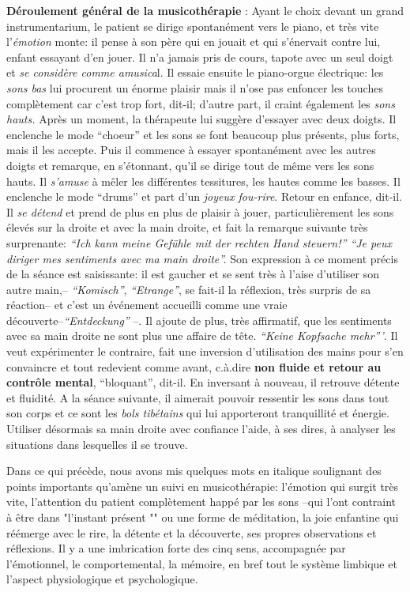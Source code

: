 \textbf{Déroulement général de la musicothérapie} :
Ayant le choix devant un grand instrumentarium,
le patient se dirige spontanément vers le piano, et très vite
l'\textit{émotion} monte: il pense à son père qui en jouait et qui
s'énervait contre lui, enfant essayant d'en
jouer. Il n'a jamais pris de cours, tapote avec un seul doigt et \textit{se considère comme
	amusica}l. Il essaie ensuite le piano-orgue  électrique: les \textit{sons bas}
lui procurent un énorme plaisir mais il n'ose pas enfoncer les touches
complètement car c'est trop fort, dit-il; d'autre part, il
craint également les
\textit{sons hauts.}
Après un moment, la thérapeute lui suggère d'essayer avec deux doigts.
Il enclenche le mode ``choeur'' et les sons se font beaucoup
plus présents, plus forts, mais il les accepte. Puis il commence à essayer spontanément
avec les autres doigts et remarque,  en s'étonnant, qu'il se
dirige tout de même vers les sons
hauts. Il \textit{s'amuse} à mêler les différentes tessitures,
les hautes comme les basses.
Il enclenche le mode ``drums'' et part d'un\textit{ joyeux
	fou-rire}. Retour en enfance, dit-il.
Il \textit{se détend} et prend de plus en plus de plaisir à jouer, particulièrement  les sons élevés
sur la droite et avec la main droite, et fait
la remarque suivante très surprenante:
\textit{``Ich kann meine Gefühle mit der rechten Hand steuern!''
	``Je peux diriger mes sentiments avec ma main droite''.}
Son expression à ce moment précis de la séance est saisissante: il
est gaucher et se sent très à l'aise d'utiliser son autre
main,-- \textit{``Komisch''},  \textit{``Etrange''}, se fait-il
la réflexion, très surpris de sa réaction-- et c'est un événement
accueilli comme une vraie
découverte--\textit{``Entdeckung''} --.
Il ajoute de plus, très affirmatif, que les sentiments avec sa main
droite ne sont plus une affaire de tête. \textit{``Keine
	Kopfsache mehr'''}. Il veut expérimenter le contraire, fait
une inversion d'utilisation des mains pour s'en convaincre et tout redevient comme
avant, c.à.dire \textbf{non fluide et retour au contrôle
	mental},
``bloquant'', dit-il. En inversant à nouveau, il retrouve
détente et fluidité.
A la séance suivante, il aimerait pouvoir ressentir
les sons dans tout son corps et ce sont les\textit{ bols
	tibétains } qui lui
apporteront tranquillité et
énergie. Utiliser désormais sa main
droite avec confiance l'aide, à ses dires, à analyser les
situations dans lesquelles il se trouve.


Dans ce qui précède, nous avons mis quelques mots en italique soulignant des  points
importants qu'amè\-ne un suivi en musicothérapie: l'émotion qui surgit très
vite,
l'attention du patient complètement happé par les sons --qui l'ont
contraint à être dans "l'instant présent "" ou une forme de méditation, la joie
enfantine qui réémerge avec le rire, la détente et la découverte,
ses propres observations et réflexions.
Il y a une imbrication forte des cinq sens, accompagnée par l'émotionnel, le comportemental, la
mémoire, en bref tout le système limbique et l'aspect
physiologique et psychologique.

